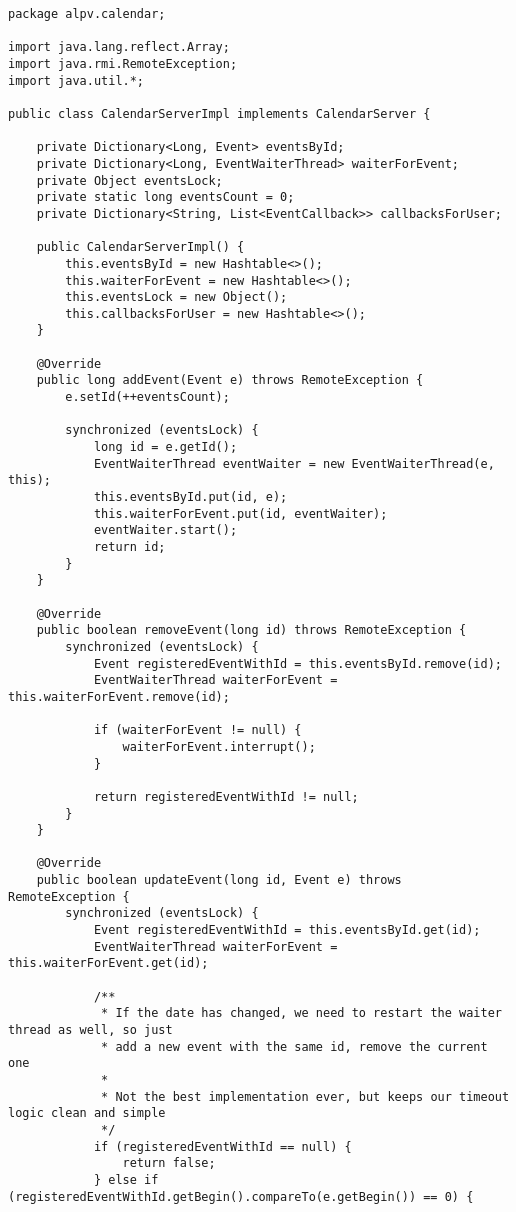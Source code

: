 \begin{lstlisting}[style=java]
package alpv.calendar;

import java.lang.reflect.Array;
import java.rmi.RemoteException;
import java.util.*;

public class CalendarServerImpl implements CalendarServer {

    private Dictionary<Long, Event> eventsById;
    private Dictionary<Long, EventWaiterThread> waiterForEvent;
    private Object eventsLock;
    private static long eventsCount = 0;
    private Dictionary<String, List<EventCallback>> callbacksForUser;

    public CalendarServerImpl() {
        this.eventsById = new Hashtable<>();
        this.waiterForEvent = new Hashtable<>();
        this.eventsLock = new Object();
        this.callbacksForUser = new Hashtable<>();
    }

    @Override
    public long addEvent(Event e) throws RemoteException {
        e.setId(++eventsCount);

        synchronized (eventsLock) {
            long id = e.getId();
            EventWaiterThread eventWaiter = new EventWaiterThread(e, this);
            this.eventsById.put(id, e);
            this.waiterForEvent.put(id, eventWaiter);
            eventWaiter.start();
            return id;
        }
    }

    @Override
    public boolean removeEvent(long id) throws RemoteException {
        synchronized (eventsLock) {
            Event registeredEventWithId = this.eventsById.remove(id);
            EventWaiterThread waiterForEvent = this.waiterForEvent.remove(id);

            if (waiterForEvent != null) {
                waiterForEvent.interrupt();
            }

            return registeredEventWithId != null;
        }
    }

    @Override
    public boolean updateEvent(long id, Event e) throws RemoteException {
        synchronized (eventsLock) {
            Event registeredEventWithId = this.eventsById.get(id);
            EventWaiterThread waiterForEvent = this.waiterForEvent.get(id);

            /**
             * If the date has changed, we need to restart the waiter thread as well, so just
             * add a new event with the same id, remove the current one
             *
             * Not the best implementation ever, but keeps our timeout logic clean and simple
             */
            if (registeredEventWithId == null) {
                return false;
            } else if (registeredEventWithId.getBegin().compareTo(e.getBegin()) == 0) {


\end{lstlisting}
